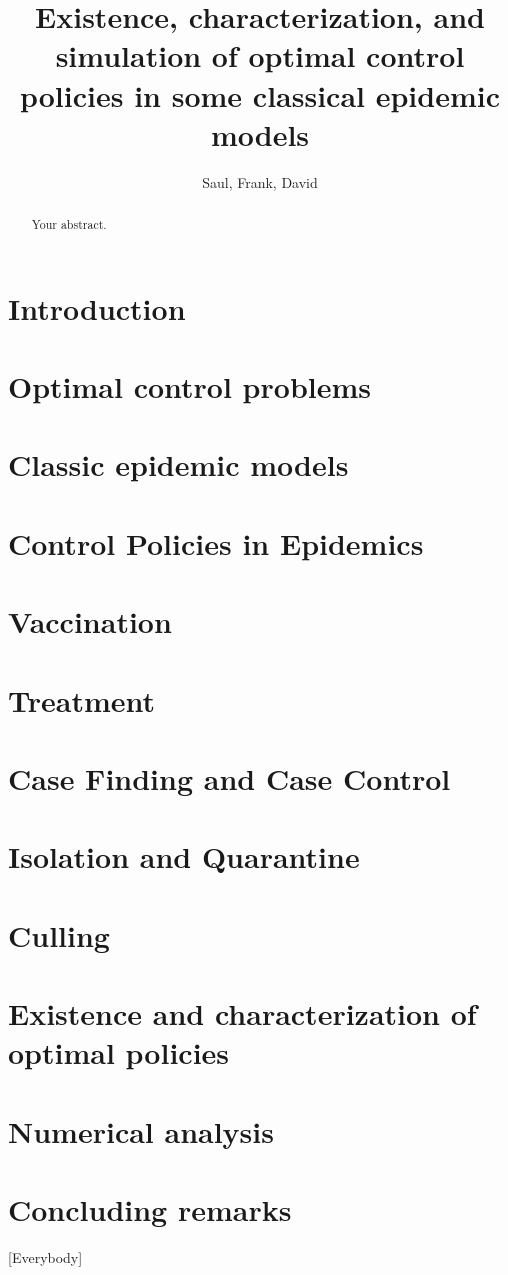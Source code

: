 \documentclass[a4paper]{amsart}
\title[%
	Existence, characterization and simulation of OCP for some epidemic 
	Models%
	]{
	Existence, characterization, and simulation
	of optimal control policies in some classical epidemic models
}
\author{Saul, Frank, David}
\begin{document}
	\maketitle
  \begin{abstract}
  	Your abstract.
  \end{abstract}
  \section{Introduction}
    
  \section{Optimal control problems}
    
  \section{Classic epidemic models}
  \section{Control Policies in Epidemics}
    
  \section{Vaccination}
    
  \section{Treatment}
    
  \section{Case Finding and Case Control}
    
  \section{Isolation and Quarantine}
    
  \section{Culling}
    
  \section{Existence and characterization of optimal policies}
  \section{Numerical analysis}
    
  \section{Concluding remarks}
    [Everybody]
%
  
  
\end{document}
